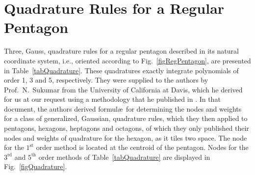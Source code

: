 \section{Quadrature Rules for a Regular Pentagon}
\label{secGauss}

Three, Gauss, quadrature rules for a regular pentagon described in its natural coordinate system, i.e., oriented according to Fig.~\ref{figRegPentagon}, are presented in Table~\ref{tabQuadrature}.  These quadratures exactly integrate polynomials of order 1, 3 and 5, respectively.  They were supplied to the authors by Prof.\ N.\ Sukumar from the University of California at Davis, which he derived for us at our request using a methodology that he published in \cite{Mousavietal10}.  In that document, the authors derived formul\ae\ for determining the nodes and weights for a class of generalized, Gaussian, quadrature rules, which they then applied to pentagons, hexagons, heptagons and octagons, of which they only published their nodes and weights of quadrature for the hexagon, as it tiles two space.  The node for the $1^{\mathrm{st}}$ order method is located at the centroid of the pentagon.  Nodes for the $3^{\mathrm{rd}}$ and $5^{\mathrm{th}}$ order methods of Table~\ref{tabQuadrature} are displayed in Fig.~\ref{figQuadrature}.

